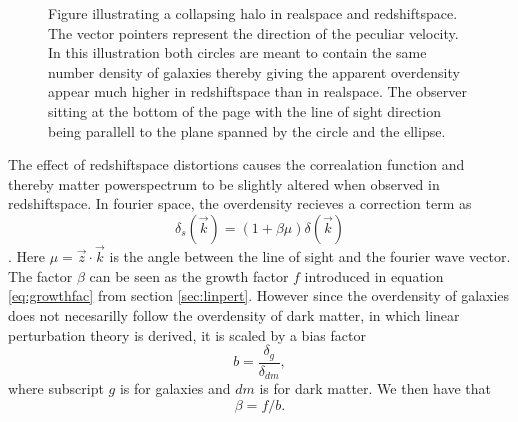 \begin{figure}[htbp]\label{fig:rsddistortion}
    \caption{Figure illustrating a collapsing halo in realspace and redshiftspace. The vector pointers represent the direction of the peculiar velocity. In this illustration both circles are meant to contain the same number density of galaxies thereby giving the apparent overdensity appear much higher in redshiftspace than in realspace. The observer sitting at the bottom of the page with the line of sight direction being parallell to the plane spanned by the circle and the ellipse.}
\end{figure}
The effect of redshiftspace distortions causes the correalation function and thereby
matter powerspectrum to be slightly altered when observed in redshiftspace. In
fourier space, the overdensity recieves a correction term as
\begin{equation}
    \delta_s(\vec{k})=(1+\beta\mu)\delta(\vec{k})
\end{equation}
\cite[p.~279]{Dodelson:1282338}. Here $\mu=\vec{z}\cdot\vec{k}$ is the angle
between the line of sight and the fourier wave vector. The factor $\beta$ can be
seen as the growth factor $f$ introduced in equation \ref{eq:growthfac} from
section \ref{sec:linpert}. However since the overdensity of galaxies does not
necesarilly follow the overdensity of dark matter, in which linear perturbation
theory is derived, it is scaled by a bias factor
\begin{equation}\label{eq:bias}
    b=\frac{\delta_g}{\delta_{dm}},
\end{equation}
where subscript $g$ is for galaxies and $dm$ is for dark matter. We then have
that
\begin{equation}\label{eq:beta}
    \beta=f/b.
\end{equation} 

